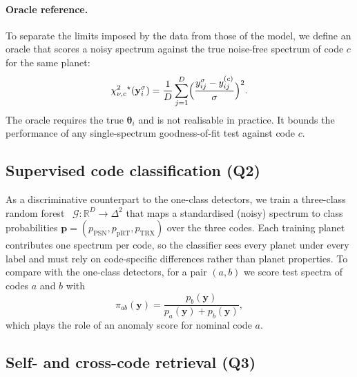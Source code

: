 \paragraph{Oracle reference.}
To separate the limits imposed by the data from those of the model, we define an oracle that scores a noisy spectrum against the true noise-free spectrum of code $c$ for the same planet:
\begin{equation}
  \chi^{2}_{\nu,c}{}^{\star}(\mathbf{y}_i^{\sigma}) = \frac{1}{D}\sum_{j=1}^{D}\Bigl(\frac{y^{\sigma}_{ij}-y^{(c)}_{ij}}{\sigma}\Bigr)^{2}.
  \label{eq:oracle}
\end{equation}
The oracle requires the true $\bm{\theta}_i$ and is not realisable in practice.
It bounds the performance of any single-spectrum goodness-of-fit test against code $c$.

\subsection{Supervised code classification (Q2)}
\label{sec:rf}

As a discriminative counterpart to the one-class detectors, we train a three-class random forest~\cite{TODO_breiman_random_forests} $\mathcal{G}:\mathbb{R}^{D}\rightarrow\Delta^{2}$ that maps a standardised (noisy) spectrum to class probabilities $\mathbf{p}=(p_{\mathrm{PSN}},p_{\mathrm{pRT}},p_{\mathrm{TRX}})$ over the three codes.
Each training planet contributes one spectrum per code, so the classifier sees every planet under every label and must rely on code-specific differences rather than planet properties.
To compare with the one-class detectors, for a pair $(a,b)$ we score test spectra of codes $a$ and $b$ with
\begin{equation}
  \pi_{ab}(\mathbf{y}) = \frac{p_b(\mathbf{y})}{p_a(\mathbf{y})+p_b(\mathbf{y})},
  \label{eq:pairscore}
\end{equation}
which plays the role of an anomaly score for nominal code $a$.

\subsection{Self- and cross-code retrieval (Q3)}
\label{sec:retrieval}

